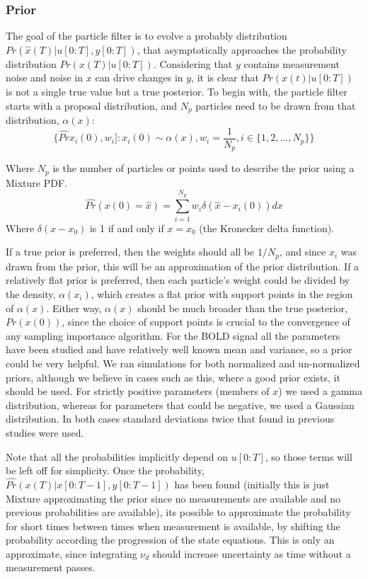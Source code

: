 \documentclass{article}
\begin{document}
\subsubsection{Prior}

The goal of the particle filter is to evolve a probably distribution 
$Pr(\hat{x}(T) | u[0:T], y[0:T])$,
that asymptotically approaches the probability distribution $Pr(x(T) | u[0:T])$.
Considering that $y$ contains measurement noise and noise in $x$ can drive
changes in $y$, it is clear that $Pr(x(t) | u[0:T])$ is not a single true value
but a true posterior. 
To begin with, the particle filter starts with a proposal distribution, and $N_p$
particles need to be drawn from that distribution, $\alpha(x)$:
\begin{equation}
\{\hat{Pr}x_i(0),w_i] : x_i(0) \sim \alpha(x), w_i = \frac{1}{N_p}, i \in \{1, 2, ... , N_p\} \}
\end{equation}

Where $N_p$ is the number of particles or points used to describe the prior 
using a Mixture PDF. 
\begin{equation}
\hat{Pr}(x(0) = \hat{x}) = \sum_{i=1}^{N_p} w_i\delta(\hat{x} - x_i(0) ) dx
\end{equation}
Where $\delta(x-x_0)$ is 1 if and only if $x = x_0$ (the Kronecker delta function).

If a true prior is preferred, then the weights
should all be $1/N_p$, and since $x_i$ was drawn from the prior, this will
be an approximation of the prior distribution. If a relatively flat prior is 
preferred, then each particle's weight could be divided by the density, $\alpha(x_i)$,
which creates a flat prior with support points in the region of $\alpha(x)$. Either
way, $\alpha(x)$ should be much broader than the true posterior, $Pr(x(0))$, since the
choice of support points is crucial to the convergence of any sampling importance
algorithm. 
For the BOLD signal all the parameters have been studied and have relatively well
known mean and variance, so a prior could be very helpful. We ran simulations for
both normalized and un-normalized priors, although we believe in cases such as this,
where a good prior exists, it should be used. 
For strictly positive parameters (members of $x$) we used a gamma distribution,
whereas for parameters that could be negative, we used a Gaussian distribution. In
both cases standard deviations twice that found in previous studies were used.

Note that all the probabilities implicitly depend on $u[0:T]$, so those terms 
will be left off for simplicity.
Once the probability, $\hat{Pr}(x(T) | x[0:T-1], y[0:T-1])$ has been found
(initially this is just Mixture approximating the prior since no measurements are 
available and no previous probabilities are available), its possible to approximate
the probability for short times between times when measurement is available, by shifting
the probability according the progression of the state equations. This is only 
an approximate, since integrating $\nu_d$ should increase uncertainty as
time without a measurement passes. 
\end{document}

